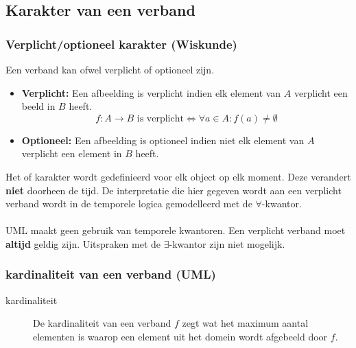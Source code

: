 \documentclass[../main.tex]{subfiles}
\begin{document}
\subsection{Karakter van een verband}
\subsubsection{Verplicht/optioneel karakter (Wiskunde)}
Een verband kan ofwel verplicht of optioneel zijn.
\begin{itemize}
	\item \textbf{Verplicht:} Een afbeelding is verplicht indien elk element van $A$ verplicht een beeld in $B$ heeft. \\
	\begin{equation*}
	\boxed{f:A \rightarrow B \textrm{ is verplicht} \Leftrightarrow \forall a \in A:f(a) \neq \emptyset}
	\end{equation*}
	\item \textbf{Optioneel:} Een afbeelding is optioneel indien niet elk element van $A$ verplicht een element in $B$ heeft.
\end{itemize}
Het  of  karakter wordt gedefinieerd voor elk object op elk moment. Deze verandert \textbf{niet} doorheen de tijd. De interpretatie die hier gegeven wordt aan een verplicht verband wordt in de temporele logica gemodelleerd met de $\forall$-kwantor.
\\
\\
UML maakt geen gebruik van temporele kwantoren. Een verplicht verband moet \textbf{altijd} geldig zijn. Uitspraken met de $\exists$-kwantor zijn niet mogelijk.
\subsubsection{kardinaliteit van een verband (UML)}
\begin{description}
	\item[kardinaliteit] De kardinaliteit van een verband $f$ zegt wat het maximum aantal elementen is waarop een element uit het domein wordt afgebeeld door $f$.
\end{description}
\end{document}
